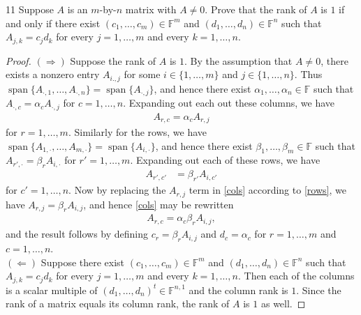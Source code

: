 \documentclass{extarticle}
\newenvironment{problem}[1]{\begin{prob*}{#1}{}}{\end{prob*}}
\newcommand{\F}{\mathbb{F}}
\DeclareMathOperator{\Span}{span}
\begin{document}
\begin{problem}{11}
Suppose $A$ is an $m$-by-$n$ matrix with $A\neq 0$.  Prove that the rank of $A$ is $1$ if and only if there exist $(c_1,\dots,c_m)\in\F^m$ and $(d_1,\dots,d_n)\in\F^n$ such that $A_{j,k}=c_jd_k$ for every $j=1,\dots,m$ and every $k=1,\dots,n$.
\end{problem}
\begin{proof}
$(\Rightarrow)$ Suppose the rank of $A$ is $1$.  By the assumption that $A\neq 0$, there exists a nonzero entry $A_{i.,j}$ for some $i\in\{1,\dots,m\}$ and $j\in\{1,\dots,n\}$.  Thus $\Span\{A_{\cdot, 1},\dots, A_{\cdot, n}\}= \Span\{A_{\cdot, j}\}$, and hence there exist $\alpha_1,\dots, \alpha_n\in\F$ such that $A_{\cdot, c} = \alpha_cA_{\cdot, j}$ for $c = 1,\dots, n$.  Expanding out each out these columns, we have
\begin{align}\label{cols}
A_{r,c} = \alpha_c A_{r, j}
\end{align}
for $r = 1,\dots,m$.  Similarly for the rows, we have $\Span\{A_{1, \cdot},\dots, A_{m, \cdot}\}= \Span\{A_{i, \cdot}\}$, and hence there exist $\beta_1,\dots, \beta_m\in\F$ such that $A_{r',\cdot} = \beta_r A_{i,\cdot}$ for $r' = 1,\dots,m$.  Expanding out each of these rows, we have
\begin{align}\label{rows}
A_{r', c'} &= \beta_{r'} A_{i, c'}
\end{align}
for $c' = 1,\dots, n$.  Now by replacing the $A_{r, j}$ term in \eqref{cols} according to \eqref{rows}, we have $A_{r,j} =  \beta_rA_{i,j}$, and hence \eqref{cols} may be rewritten
\begin{align*}
A_{r,c} = \alpha_c\beta_r A_{i,j},
\end{align*}
and the result follows by defining $c_r = \beta_rA_{i,j}$ and $d_c = \alpha_c$ for $r=  1,\dots, m$ and $c = 1,\dots, n$.\\
\indent $(\Leftarrow)$ Suppose there exist $(c_1,\dots,c_m)\in\F^m$ and $(d_1,\dots,d_n)\in\F^n$ such that $A_{j,k}=c_jd_k$ for every $j=1,\dots,m$ and every $k=1,\dots,n$.  Then each of the columns is a scalar multiple of $(d_1,\dots,d_n)^t\in\F^{n,1}$ and the column rank is $1$.  Since the rank of a matrix equals its column rank, the rank of $A$ is $1$ as well.
\end{proof}
\end{document}
